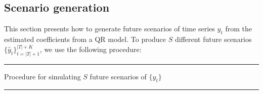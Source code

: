 




\subsection{Scenario generation} \label{sec:scenario-generation}

This section presents how to generate future scenarios of time series $y_t$ from the estimated coefficients from a QR model. 
To produce $S$ different future scenarios $\{ \hat{y}_t \}_{t=|T|+1}^{|T|+K}$, we use the following procedure:

\noindent\rule{\columnwidth}{3pt}

Procedure for simulating $S$ future scenarios of $\{y_t\}$

\noindent\rule{\columnwidth}{1pt}

